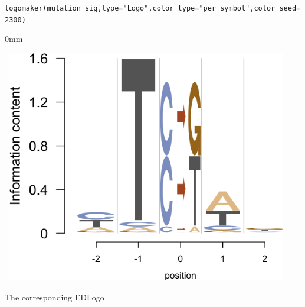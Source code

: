 \documentclass[12pt]{article}\usepackage[]{graphicx}\usepackage[usenames,dvipsnames]{color}
\newcommand{\hlnum}[1]{\textcolor[rgb]{0.816,0.125,0.439}{#1}}%
\newcommand{\hlstr}[1]{\textcolor[rgb]{0.251,0.627,0.251}{#1}}%
\newcommand{\hlstd}[1]{\textcolor[rgb]{0.251,0.251,0.251}{#1}}%
\newcommand{\hlkwc}[1]{\textcolor[rgb]{0.251,0.251,0.251}{#1}}%
\newcommand{\hlkwd}[1]{\textcolor[rgb]{0.878,0.439,0.125}{#1}}%
\newenvironment{knitrout}{}{} %
\begin{document}
\begin{knitrout}
\color{fgcolor}\begin{kframe}
\begin{alltt}
\hlkwd{logomaker}\hlstd{(mutation_sig,} \hlkwc{type} \hlstd{=} \hlstr{"Logo"}\hlstd{,} \hlkwc{color_type} \hlstd{=} \hlstr{"per_symbol"}\hlstd{,}  \hlkwc{color_seed} \hlstd{=} \hlnum{2300}\hlstd{)}
\end{alltt}
\end{kframe}\begin{adjustwidth}{\fltoffset}{0mm}

\includegraphics[width=5in,height=4in]{figure/mutsig3-1} \hfill{}

\end{adjustwidth}
\end{knitrout}

The corresponding EDLogo
\end{document}
